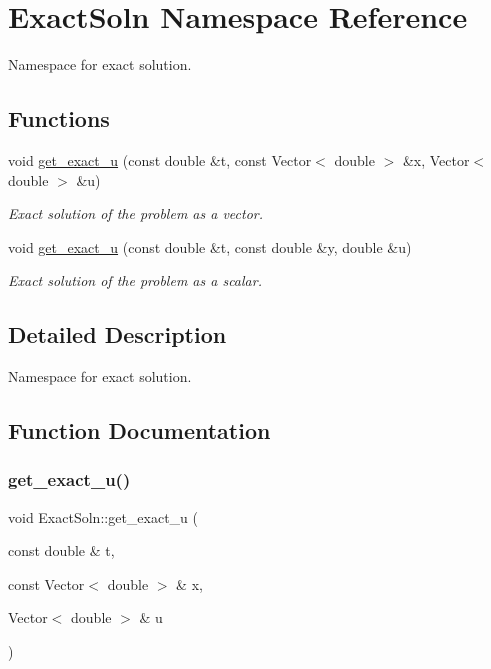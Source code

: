 \hypertarget{namespaceExactSoln}{}\section{Exact\+Soln Namespace Reference}
\label{namespaceExactSoln}


Namespace for exact solution.  


\subsection*{Functions}
\begin{DoxyCompactItemize}
\item 
void \hyperlink{namespaceExactSoln_a2598550281dd62f4160edb3d0b2e5432}{get\+\_\+exact\+\_\+u} (const double \&t, const Vector$<$ double $>$ \&x, Vector$<$ double $>$ \&u)
\begin{DoxyCompactList}\small\item\em Exact solution of the problem as a vector. \end{DoxyCompactList}\item 
void \hyperlink{namespaceExactSoln_ae21d368b911f958acec957ead190db93}{get\+\_\+exact\+\_\+u} (const double \&t, const double \&y, double \&u)
\begin{DoxyCompactList}\small\item\em Exact solution of the problem as a scalar. \end{DoxyCompactList}\end{DoxyCompactItemize}


\subsection{Detailed Description}
Namespace for exact solution. 

\subsection{Function Documentation}
\mbox{\label{namespaceExactSoln_a2598550281dd62f4160edb3d0b2e5432}} 
\subsubsection{\texorpdfstring{get\+\_\+exact\+\_\+u()}{get\_exact\_u()}\hspace{0.1cm}{\footnotesize\ttfamily [1/2]}}
{\footnotesize\ttfamily void Exact\+Soln\+::get\+\_\+exact\+\_\+u (\begin{DoxyParamCaption}\item[{const double \&}]{t,  }\item[{const Vector$<$ double $>$ \&}]{x,  }\item[{Vector$<$ double $>$ \&}]{u }\end{DoxyParamCaption})}



